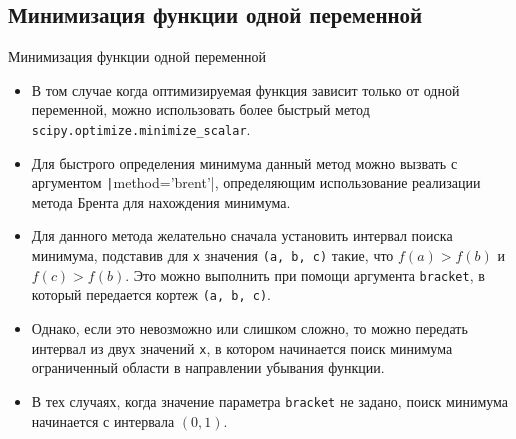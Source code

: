 \documentclass[aspectratio=169, mathserif]{beamer}	%
\begin{document}
\subsection{Минимизация функции одной переменной}
\begin{frame}[fragile]{Минимизация функции одной переменной}
\scriptsize
\begin{itemize}
\item В том случае когда оптимизируемая функция зависит только от одной переменной, можно использовать более быстрый метод \texttt{scipy.optimize.minimize\_scalar}.
\item Для быстрого определения минимума данный метод можно вызвать с аргументом \texttt|method='brent'|, определяющим использование реализации метода Брента для нахождения минимума.
\item Для данного метода желательно сначала установить интервал поиска минимума, подставив для \texttt{x} значения \texttt{(a, b, c)} такие, что $f(a) > f(b)$ и $f(c) > f(b)$. Это можно выполнить при помощи аргумента \texttt{bracket}, в который передается кортеж \texttt{(a, b, c)}.
\item Однако, если это невозможно или слишком сложно, то можно передать интервал из двух значений \texttt{x}, в котором начинается поиск минимума ограниченный области в направлении убывания функции.
\item В тех случаях, когда значение параметра \texttt{bracket} не задано, поиск минимума начинается с интервала $(0, 1)$.
\end{itemize}
\vfill
\end{frame}
\end{document}
